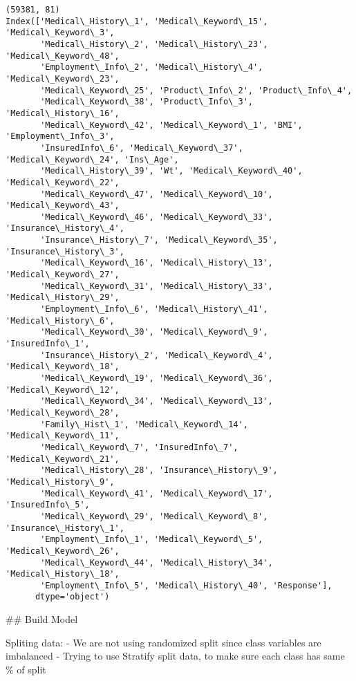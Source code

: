 \documentclass[11pt]{article}
\begin{document}
    \begin{Verbatim}[commandchars=\\\{\}]
(59381, 81)
Index(['Medical\_History\_1', 'Medical\_Keyword\_15', 'Medical\_Keyword\_3',
       'Medical\_History\_2', 'Medical\_History\_23', 'Medical\_Keyword\_48',
       'Employment\_Info\_2', 'Medical\_History\_4', 'Medical\_Keyword\_23',
       'Medical\_Keyword\_25', 'Product\_Info\_2', 'Product\_Info\_4',
       'Medical\_Keyword\_38', 'Product\_Info\_3', 'Medical\_History\_16',
       'Medical\_Keyword\_42', 'Medical\_Keyword\_1', 'BMI', 'Employment\_Info\_3',
       'InsuredInfo\_6', 'Medical\_Keyword\_37', 'Medical\_Keyword\_24', 'Ins\_Age',
       'Medical\_History\_39', 'Wt', 'Medical\_Keyword\_40', 'Medical\_Keyword\_22',
       'Medical\_Keyword\_47', 'Medical\_Keyword\_10', 'Medical\_Keyword\_43',
       'Medical\_Keyword\_46', 'Medical\_Keyword\_33', 'Insurance\_History\_4',
       'Insurance\_History\_7', 'Medical\_Keyword\_35', 'Insurance\_History\_3',
       'Medical\_Keyword\_16', 'Medical\_History\_13', 'Medical\_Keyword\_27',
       'Medical\_Keyword\_31', 'Medical\_History\_33', 'Medical\_History\_29',
       'Employment\_Info\_6', 'Medical\_History\_41', 'Medical\_History\_6',
       'Medical\_Keyword\_30', 'Medical\_Keyword\_9', 'InsuredInfo\_1',
       'Insurance\_History\_2', 'Medical\_Keyword\_4', 'Medical\_Keyword\_18',
       'Medical\_Keyword\_19', 'Medical\_Keyword\_36', 'Medical\_Keyword\_12',
       'Medical\_Keyword\_34', 'Medical\_Keyword\_13', 'Medical\_Keyword\_28',
       'Family\_Hist\_1', 'Medical\_Keyword\_14', 'Medical\_Keyword\_11',
       'Medical\_Keyword\_7', 'InsuredInfo\_7', 'Medical\_Keyword\_21',
       'Medical\_History\_28', 'Insurance\_History\_9', 'Medical\_History\_9',
       'Medical\_Keyword\_41', 'Medical\_Keyword\_17', 'InsuredInfo\_5',
       'Medical\_Keyword\_29', 'Medical\_Keyword\_8', 'Insurance\_History\_1',
       'Employment\_Info\_1', 'Medical\_Keyword\_5', 'Medical\_Keyword\_26',
       'Medical\_Keyword\_44', 'Medical\_History\_34', 'Medical\_History\_18',
       'Employment\_Info\_5', 'Medical\_History\_40', 'Response'],
      dtype='object')

    \end{Verbatim}

     \#\# Build Model

    Spliting data: - We are not using randomized split since class variables
are imbalanced - Trying to use Stratify split data, to make sure each
class has same \% of split
\end{document}

